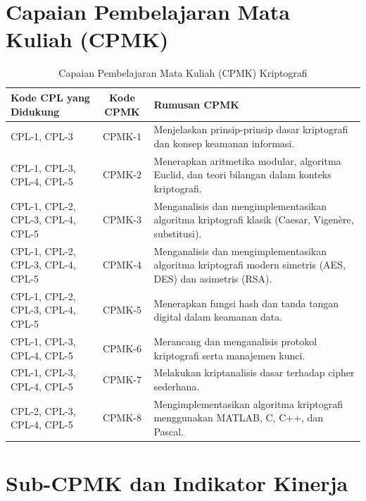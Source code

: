 \documentclass[12pt,a4paper]{article}
\begin{document}
\section{Capaian Pembelajaran Mata Kuliah (CPMK)}

\begin{table}[!htbp]
\centering
\small
\begin{tabular}{|>{\raggedright\arraybackslash}p{3.4cm}|c|>{\raggedright\arraybackslash}p{6.2cm}|}
\hline
\textbf{Kode CPL yang Didukung} & \textbf{Kode CPMK} & \textbf{Rumusan CPMK} \\
\hline
CPL-1, CPL-3 & CPMK-1 & Menjelaskan prinsip-prinsip dasar kriptografi dan konsep keamanan informasi. \\
\hline
CPL-1, CPL-3, CPL-4, CPL-5 & CPMK-2 & Menerapkan aritmetika modular, algoritma Euclid, dan teori bilangan dalam konteks kriptografi. \\
\hline
CPL-1, CPL-2, CPL-3, CPL-4, CPL-5 & CPMK-3 & Menganalisis dan mengimplementasikan algoritma kriptografi klasik (Caesar, Vigenère, substitusi). \\
\hline
CPL-1, CPL-2, CPL-3, CPL-4, CPL-5 & CPMK-4 & Menganalisis dan mengimplementasikan algoritma kriptografi modern simetris (AES, DES) dan asimetris (RSA). \\
\hline
CPL-1, CPL-2, CPL-3, CPL-4, CPL-5 & CPMK-5 & Menerapkan fungsi hash dan tanda tangan digital dalam keamanan data. \\
\hline
CPL-1, CPL-3, CPL-4, CPL-5 & CPMK-6 & Merancang dan menganalisis protokol kriptografi serta manajemen kunci. \\
\hline
CPL-1, CPL-3, CPL-4, CPL-5 & CPMK-7 & Melakukan kriptanalisis dasar terhadap cipher sederhana. \\
\hline
CPL-2, CPL-3, CPL-4, CPL-5 & CPMK-8 & Mengimplementasikan algoritma kriptografi menggunakan MATLAB, C, C++, dan Pascal. \\
\hline
\end{tabular}
\caption{Capaian Pembelajaran Mata Kuliah (CPMK) Kriptografi}
\end{table}

\section{Sub-CPMK dan Indikator Kinerja}
\end{document}
